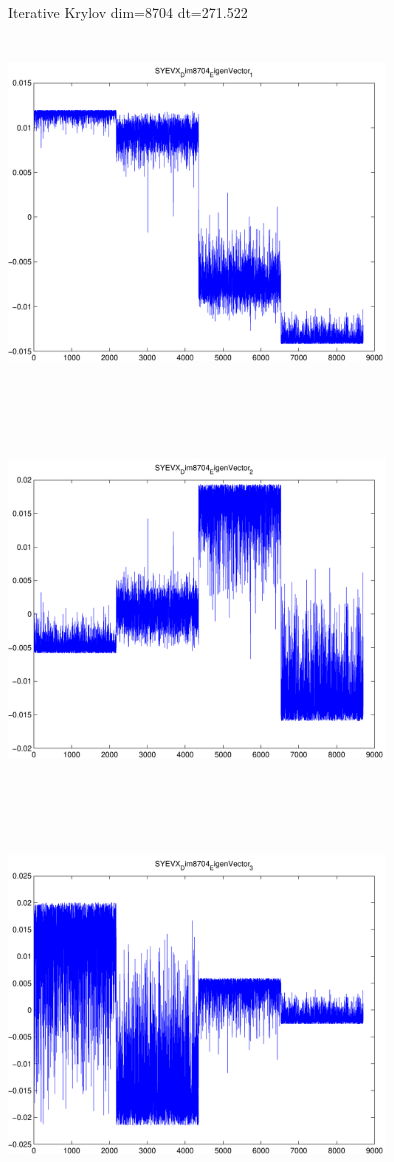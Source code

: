 \documentclass[9pt]{article}
\theoremstyle{plain}
\theoremstyle{definition}
\theoremstyle{remark}
\numberwithin{equation}{section}
\begin{document}
Iterative Krylov dim=8704 dt=271.522
\includegraphics[width=10.0cm,height=10.0cm]{SYEVX_Dim8704_EigenVector_1.pdf}

\includegraphics[width=10.0cm,height=10.0cm]{SYEVX_Dim8704_EigenVector_2.pdf}

\includegraphics[width=10.0cm,height=10.0cm]{SYEVX_Dim8704_EigenVector_3.pdf}
\end{document}

